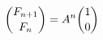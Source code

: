 \documentclass[preview]{standalone}
\begin{document}
\begin{align*}
\special{dvisvgm:raw <g id='unique000'>}\binom{F_{n+1}}{F_n}=A^n\binom10\special{dvisvgm:raw </g>}
\end{align*}
\end{document}
